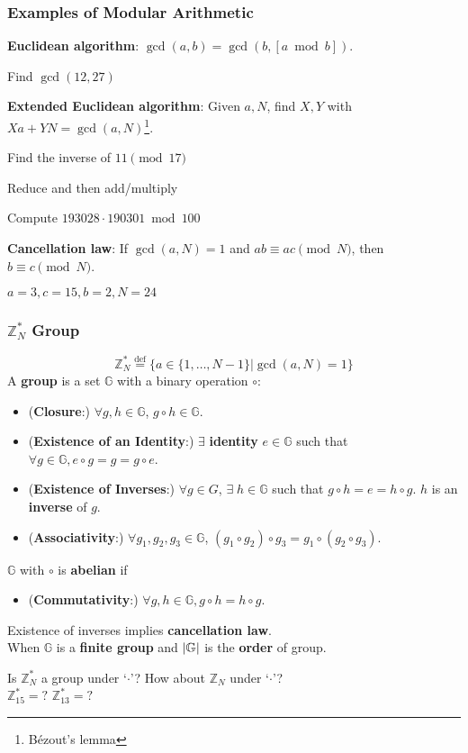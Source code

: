 \begin{frame}\frametitle{Examples of Modular Arithmetic}
\textbf{Euclidean algorithm}: $\gcd(a,b) = \gcd(b, [a \bmod b]).$
\begin{exampleblock}{Find $\gcd(12, 27)$}
\end{exampleblock}
\textbf{Extended Euclidean algorithm}: Given $a,N$, find $X,Y$ with $Xa+YN = \gcd(a,N)$\footnote{B\'{e}zout's lemma}.
\begin{exampleblock}{Find the inverse of $11 \pmod {17}$}
\end{exampleblock}
Reduce and then add/multiply
\begin{exampleblock}{Compute $193028 \cdot 190301 \bmod 100$}
\end{exampleblock}
\textbf{Cancellation law}: If $\gcd(a,N)=1$ and $ab \equiv ac \pmod N$, then $b \equiv c \pmod N$.
\begin{exampleblock}{$a=3, c=15, b=2, N=24$}
\end{exampleblock}
\end{frame}
\begin{frame}\frametitle{$\mathbb{Z}_N^*$ Group}
\[ \mathbb{Z}_N^* \overset{\text{def}}{=} \{a \in \{1,\dotsc,N-1 \} | \gcd(a,N) = 1\} \]
A \textbf{group} is a set $\mathbb{G}$ with a binary operation $\circ$:
\begin{itemize}
\item (\textbf{Closure}:) $\forall g,h \in \mathbb{G}$, $g \circ h \in \mathbb{G}$.
\item (\textbf{Existence of an Identity}:) $\exists$ \textbf{identity} $e\in \mathbb{G}$ such that $\forall g\in \mathbb{G}, e \circ g = g = g \circ e$.
\item (\textbf{Existence of Inverses}:) $\forall g \in G$, $\exists\; h \in \mathbb{G}$ such that $g \circ h =e = h \circ g$. $h$ is an \textbf{inverse} of $g$.
\item (\textbf{Associativity}:) $\forall g_1,g_2,g_3 \in \mathbb{G}$, $(g_1\circ g_2)\circ g_3 = g_1 \circ (g_2 \circ g_3)$.
\end{itemize}
$\mathbb{G}$ with $\circ$ is \textbf{abelian} if
\begin{itemize}
\item (\textbf{Commutativity}:) $\forall g,h \in \mathbb{G}, g\circ h = h\circ g$.
\end{itemize}
Existence of inverses implies \textbf{cancellation law}.\\
When $\mathbb{G}$ is a \textbf{finite group} and $\lvert\mathbb{G}\rvert$ is the \textbf{order} of group.
\begin{exampleblock}{
Is $\mathbb{Z}_N^*$ a group under `$\cdot$'? How about $\mathbb{Z}_N$ under `$\cdot$'?\\
$\mathbb{Z}_{15}^* = ?$ $\mathbb{Z}_{13}^* = ?$}
\end{exampleblock}
\end{frame}
